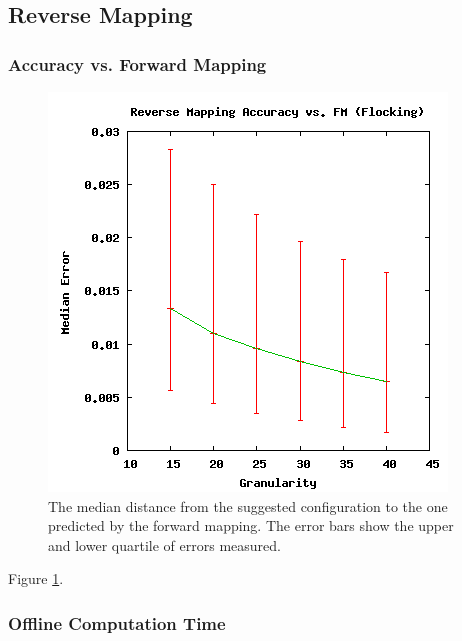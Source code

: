  \subsection{Reverse Mapping}

  \subsubsection{Accuracy vs. Forward Mapping}

\begin{figure}[ht]
\centering
\includegraphics[scale=.5]{images/results_flocking/rmacc.png}
\caption{The median distance from the suggested configuration to the one predicted by the forward mapping.
The error bars show the upper and lower quartile of errors measured.}
\label{fig:flockrmacc}
\end{figure}

Figure \ref{fig:flockrmacc}.




  \subsubsection{Offline Computation Time}

